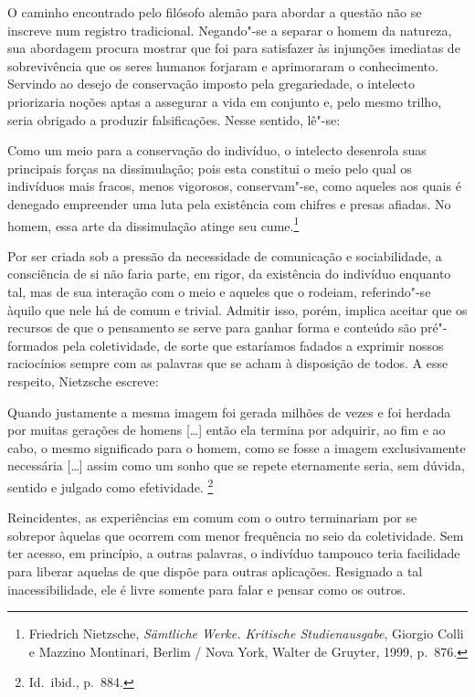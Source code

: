 O caminho encontrado pelo filósofo alemão para abordar a questão
não se inscreve num registro tradicional.
Negando"-se a
separar o homem da natureza, sua abordagem procura mostrar que foi para
satisfazer às injunções imediatas de sobrevivência que os seres humanos
forjaram e aprimoraram o conhecimento. Servindo ao desejo de
conservação imposto pela gregariedade, o intelecto priorizaria noções
aptas a assegurar a vida em conjunto e, pelo mesmo trilho, 
seria obrigado a produzir falsificações. Nesse sentido, 
lê"-se: 
\begin{hedraquote}
Como um meio para a
conservação do indivíduo, o intelecto desenrola suas principais forças
na dissimulação; pois esta constitui o meio pelo qual os indivíduos
mais fracos, menos vigorosos, conservam"-se, como aqueles aos quais é
denegado empreender uma luta pela existência com chifres e presas
afiadas. No homem, essa arte da dissimulação atinge seu
cume.\footnote{ Friedrich Nietzsche, \textit{Sämtliche Werke.
Kritische Studienausgabe}, Giorgio Colli e Mazzino Montinari,
Berlim / Nova York, Walter de Gruyter, 1999, p.~876.}
\end{hedraquote}
Por ser criada sob a pressão da necessidade de comunicação e sociabilidade, a
consciência de si não faria parte, em rigor, da existência do indivíduo
enquanto tal, mas de sua interação com o meio e aqueles que o rodeiam,
referindo"-se àquilo que nele há de comum e trivial. Admitir isso, porém,
implica aceitar que os recursos de que o pensamento se serve para
ganhar forma e conteúdo são pré"-formados pela coletividade, de sorte
que estaríamos fadados a exprimir nossos raciocínios sempre com as
palavras que se acham à disposição de todos. A esse respeito, Nietzsche
escreve: 
\begin{hedraquote}
Quando justamente a mesma imagem foi gerada milhões de vezes
e foi herdada por muitas gerações de homens [\ldots{}] então ela termina por
adquirir, ao fim e ao cabo, o mesmo significado para o homem, como se
fosse a imagem exclusivamente necessária [\dots] assim como um sonho que
se repete eternamente seria, sem dúvida, sentido e julgado como
efetividade. \footnote{ Id.~ibid., p.~884.} 
\end{hedraquote}
Reincidentes,
as experiências em comum com o outro terminariam por se sobrepor
àquelas que ocorrem com menor frequência no seio da coletividade. Sem
ter acesso, em princípio, a outras palavras, o indivíduo tampouco
teria facilidade para liberar aquelas de que dispõe para outras
aplicações. Resignado a tal inacessibilidade, ele é livre somente
para falar e pensar como os outros.

